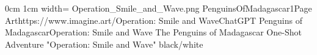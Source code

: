 \documentclass[letterpaper,openany,twoside,twocolumn]{book}
\begin{document}
	\DungeonSheetGeometry
		{0cm}%
		{1cm}%
		{width=\paperwidth}%
		{Operation_Smile_and_Wave.png}%
		{%
			{PenguinsOfMadagascar1}{Page \thepage}{Art}{https://www.imagine.art/}{Operation: Smile and Wave}{ChatGPT}%
		}%
		{{}{Penguins of Madagascar}{}{Operation: Smile and Wave}}%
		{{}{The Penguins of Madagascar One-Shot Adventure "Operation: Smile and Wave"}}%
		{black/white}%
	\clearpage
	\tableofcontents
	
\end{document}
